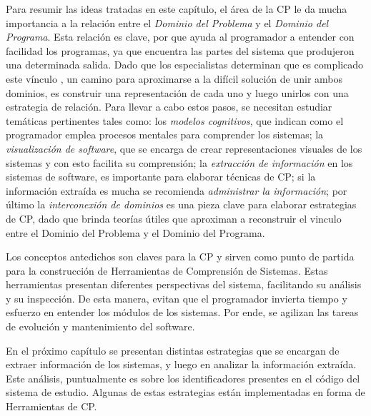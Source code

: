 Para resumir las ideas tratadas en este capítulo, el área de la CP le da mucha importancia a la relación entre el \textit{Dominio del Problema} y el \textit{Dominio del Programa}. Esta relación es clave, por que ayuda al programador a entender con facilidad los programas, ya que encuentra las partes del sistema que produjeron una determinada salida. Dado que los especialistas determinan que es complicado este vínculo \cite{AMPM11,MPMR07,MBPHRU10,DWE04}, un camino para aproximarse a la difícil solución de unir ambos dominios, es construir una representación de cada uno y luego unirlos con una estrategia de relación. Para llevar a cabo estos pasos, se necesitan estudiar temáticas pertinentes tales como: los \textit{modelos cognitivos}, que indican como el programador emplea procesos mentales para comprender los sistemas; la \textit{visualización de software}, que se encarga de crear representaciones visuales de los sistemas y con esto facilita su comprensión; la \textit{extracción de información} en los sistemas de software, es importante para elaborar técnicas de CP; si la información extraída es mucha se recomienda \textit{administrar la información}; por último la \textit{interconexión de dominios} es una pieza clave para elaborar estrategias de CP, dado que brinda teorías útiles que aproximan a reconstruir el vinculo entre el Dominio del Problema y el Dominio del Programa.




Los conceptos antedichos son claves para la CP y sirven como punto de partida para la construcción de Herramientas de Comprensión de Sistemas. Estas herramientas presentan diferentes perspectivas del sistema, facilitando su análisis y su inspección. De esta manera, evitan que el programador invierta tiempo y esfuerzo en entender los módulos de los sistemas. Por ende, se agilizan las tareas de evolución y mantenimiento del software.

En el próximo capítulo se presentan distintas estrategias que se encargan de extraer información de los sistemas, y luego en analizar la información extraída. Este análisis, puntualmente es sobre los identificadores presentes en el código del sistema de estudio. Algunas de estas estrategias están implementadas en forma de Herramientas de CP.
